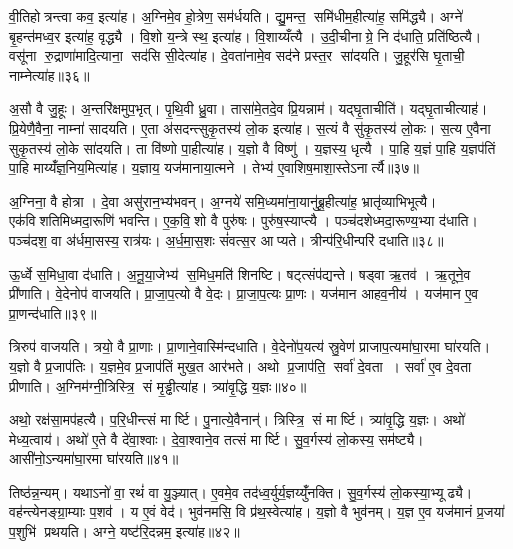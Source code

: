 वी॒तिहोत्रन्त्वा कव॒ इत्या॑ह। अ॒ग्निमे॒व हो॒त्रेण॒ सम॑र्धयति। द्यु॒मन्त॒ समि॑धीम॒हीत्या॑ह॒ समि॑द्ध्यै। अग्ने॑ बृ॒हन्त॑मध्व॒र इत्या॑ह॒ वृद्ध्यै। वि॒शो य॒न्त्रे स्थ॒ इत्या॑ह। वि॒शाय्यँत्यै। उ॒दी॒चीनाग्रे॒ नि द॑धाति॒ प्रति॑ष्ठित्यै। वसू॑ना रु॒द्राणा॑मादि॒त्याना॒ सद॑सि सी॒देत्या॑ह। दे॒वता॑नामे॒व सद॑ने प्रस्त॒र सा॑दयति। जु॒हूर॑सि घृ॒ताची॒ नाम्नेत्या॑ह॥३६॥

अ॒सौ वै जु॒हूः। अ॒न्तरि॑क्षमुप॒भृत्। पृ॒थि॒वी ध्रु॒वा। तासा॑मे॒तदे॒व प्रि॒यन्नाम॑। यद्घृ॒ताचीति॑। यद्घृ॒ताचीत्याह॑। प्रि॒येणै॒वैना॒ नाम्ना॑ सादयति। ए॒ता अ॑सदन्त्सुकृ॒तस्य॑ लो॒क इत्या॑ह। स॒त्यं वै सु॑कृ॒तस्य॑ लो॒कः। स॒त्य ए॒वैना सुकृ॒तस्य॑ लो॒के सा॑दयति। ता वि॑ष्णो पा॒हीत्या॑ह। य॒ज्ञो वै विष्णु॑। य॒ज्ञस्य॒ धृत्यै। पा॒हि य॒ज्ञं पा॒हि य॒ज्ञप॑तिं पा॒हि माय्यँ॑ज्ञ॒निय॒मित्या॑ह। य॒ज्ञाय॒ यज॑मानाया॒त्मने। तेभ्य॑ ए॒वाशिष॒माशा॒स्तेऽनार्त्यै॥३७॥\anuvakamend[स्थेत्या॑ह पृथि॒वी वेदि॒र्यन्ति॑ क्रि॒यते॒ वीणु॑र्वी॒र्य॑संमितङ्करोत्याह पाति॒ नाम्नेत्या॑ह लो॒के सा॑दयति॒ षट् च॑]

अ॒ग्निना॒ वै होत्रा। दे॒वा असु॑रान॒भ्य॑भवन्। अ॒ग्नये॑ समि॒ध्यमा॑ना॒यानु॑ब्रू॒हीत्या॑ह॒ भ्रातृ॑व्याभिभूत्यै। एक॑विशतिमिध्मदा॒रूणि॑ भवन्ति। ए॒क॒वि॒शो वै पुरु॑षः। पुरु॑ष॒स्याप्त्यै। पञ्च॑दशेध्मदा॒रूण्य॒भ्या द॑धाति। पञ्च॑दश॒ वा अ॑र्धमा॒सस्य॒ रात्र॑यः। अ॒र्ध॒मा॒स॒शः सं॑वत्स॒र आप्यते। त्रीन्प॑रि॒धीन्परि॑ दधाति॥३८॥

ऊ॒र्ध्वे स॒मिधा॒वा द॑धाति। अ॒नू॒या॒जेभ्य॑ स॒मिध॒मति॑ शिनष्टि। षट्त्संप॑द्यन्ते। षड्वा ऋ॒तव॑। ऋ॒तूने॒व प्री॑णाति। वे॒देनोप॑ वाजयति। प्रा॒जा॒प॒त्यो वै वे॒दः। प्रा॒जा॒प॒त्यः प्रा॒णः। यज॑मान आहव॒नीय॑। यज॑मान ए॒व प्रा॒णन्द॑धाति॥३९॥

त्रिरुप॑ वाजयति। त्रयो॒ वै प्रा॒णाः। प्रा॒णाने॒वास्मि॑न्दधाति। वे॒देनो॑प॒यत्य॑ स्रु॒वेण॑ प्राजाप॒त्यमा॑घा॒रमा घा॑रयति। य॒ज्ञो वै प्र॒जाप॑तिः। य॒ज्ञमे॒व प्र॒जाप॑तिं मुख॒त आर॑भते। अथो प्र॒जाप॑ति॒ सर्वा॑ दे॒वता। सर्वा॑ ए॒व दे॒वता प्रीणाति। अ॒ग्निम॑ग्नी॒त्रिस्त्रि॒ सं मृ॒ड्ढीत्या॑ह। त्र्या॑वृ॒द्धि य॒ज्ञः॥४०॥

अथो॒ रक्ष॑सा॒मप॑हत्यै। प॒रि॒धीन्त्सं मार्ष्टि। पु॒नात्ये॒वैनान्॑। त्रिस्त्रि॒ सं मार्ष्टि। त्र्या॑वृ॒द्धि य॒ज्ञः। अथो॑ मेध्य॒त्वाय॑। अथो॑ ए॒ते वै दे॑वा॒श्वाः। दे॒वा॒श्वाने॒व तत्सं मार्ष्टि। सु॒व॒र्गस्य॑ लो॒कस्य॒ सम॑ष्ट्यै। आसी॑नो॒ऽन्यमा॑घा॒रमा घा॑रयति॥४१॥

तिष्ठ॑न्न॒न्यम्। यथाऽनो॑ वा॒ रथं॑ वा यु॒ञ्ज्यात्। ए॒वमे॒व तद॑ध्व॒र्युर्य॒ज्ञय्युँ॑नक्ति। सु॒व॒र्गस्य॑ लो॒कस्या॒भ्यूढ्यै। वह॑न्त्येनङ्ग्रा॒म्याः प॒शव॑। य ए॒वं वेद॑। भुव॑नमसि॒ वि प्र॑थ॒स्वेत्या॑ह। य॒ज्ञो वै भुव॑नम्। य॒ज्ञ ए॒व यज॑मानं प्र॒जया॑ प॒शुभि॑ प्रथयति। अग्ने॒ यष्ट॑रि॒दन्नम॒ इत्या॑ह॥४२॥

